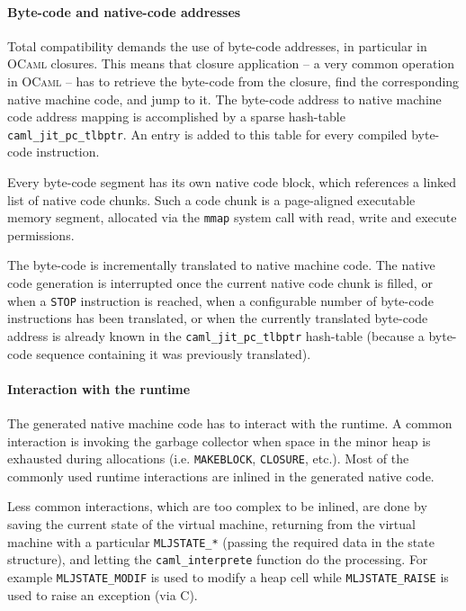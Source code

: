 \documentclass[10pt,a4paper,twocolumn]{article}
\begin{document}
\paragraph{Byte-code and native-code addresses}

Total compatibility demands the use of byte-code addresses, in particular in \textsc{OCaml}
closures. This means that closure application -- a very common operation in \textsc{OCaml} -- has
to retrieve the byte-code from the closure, find the corresponding native machine code, and jump to
it. The byte-code address to native machine code address mapping is accomplished by a sparse hash-table
\texttt{caml\_jit\_pc\_tlbptr}. An entry is added to this table for every compiled byte-code
instruction.

Every byte-code segment has its own native code block, which references a linked list of native
code chunks. Such a code chunk is a page-aligned executable memory segment, allocated via the
\texttt{mmap} system call with read, write and execute permissions.

The byte-code is incrementally translated to native machine code. The native code generation is
interrupted once the current native code chunk is filled, or when a \texttt{STOP} instruction is
reached, when a configurable number of byte-code instructions has been translated, or when the
currently translated byte-code address is already known in the \texttt{caml\_jit\_pc\_tlbptr}
hash-table (because a byte-code sequence containing it was previously translated).

\paragraph{Interaction with the runtime}

The generated native machine code has to interact with the runtime. A common interaction is
invoking the garbage collector when space in the minor heap is exhausted during allocations
(i.e. \texttt{MAKEBLOCK}, \texttt{CLOSURE}, etc.). Most of the commonly used runtime interactions
are inlined in the generated native code.

Less common interactions, which are too complex to be inlined, are done by saving the current
state of the virtual machine, returning from the virtual machine with a particular
\texttt{MLJSTATE\_*} (passing the required data in the state structure), and letting the
\texttt{caml\_interprete} function do the processing. For example \texttt{MLJSTATE\_MODIF} is
used to modify a heap cell while \texttt{MLJSTATE\_RAISE} is used to raise an exception (via C).
\end{document}
